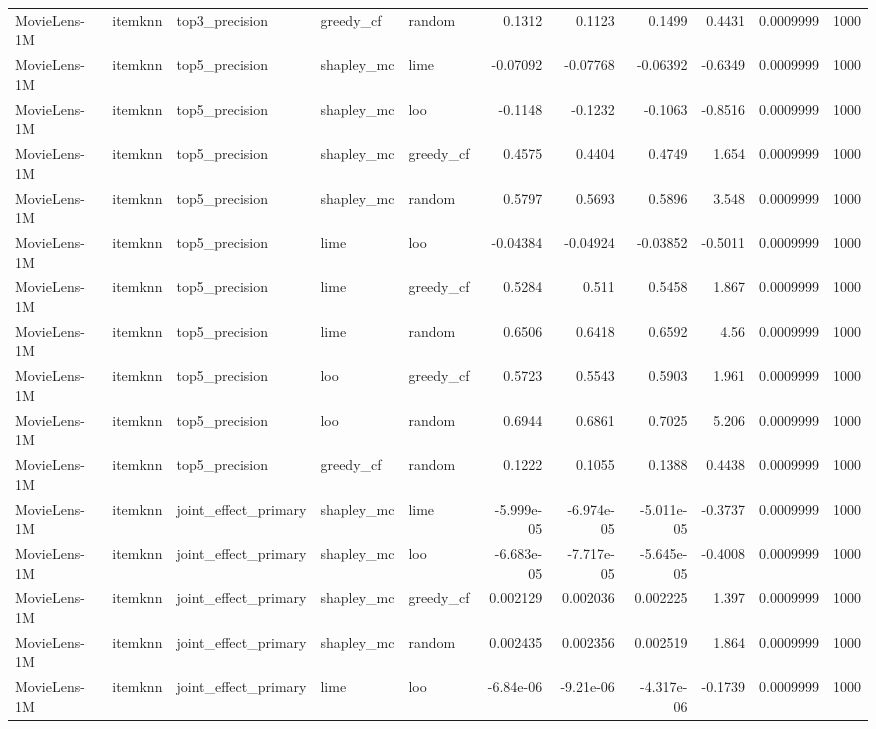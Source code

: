 \begin{table}[t]
\begin{tabular}{lllllrrrrrr}
MovieLens-1M & itemknn & top3\_precision & greedy\_cf & random & 0.1312 & 0.1123 & 0.1499 & 0.4431 & 0.0009999 & 1000 \\
MovieLens-1M & itemknn & top5\_precision & shapley\_mc & lime & -0.07092 & -0.07768 & -0.06392 & -0.6349 & 0.0009999 & 1000 \\
MovieLens-1M & itemknn & top5\_precision & shapley\_mc & loo & -0.1148 & -0.1232 & -0.1063 & -0.8516 & 0.0009999 & 1000 \\
MovieLens-1M & itemknn & top5\_precision & shapley\_mc & greedy\_cf & 0.4575 & 0.4404 & 0.4749 & 1.654 & 0.0009999 & 1000 \\
MovieLens-1M & itemknn & top5\_precision & shapley\_mc & random & 0.5797 & 0.5693 & 0.5896 & 3.548 & 0.0009999 & 1000 \\
MovieLens-1M & itemknn & top5\_precision & lime & loo & -0.04384 & -0.04924 & -0.03852 & -0.5011 & 0.0009999 & 1000 \\
MovieLens-1M & itemknn & top5\_precision & lime & greedy\_cf & 0.5284 & 0.511 & 0.5458 & 1.867 & 0.0009999 & 1000 \\
MovieLens-1M & itemknn & top5\_precision & lime & random & 0.6506 & 0.6418 & 0.6592 & 4.56 & 0.0009999 & 1000 \\
MovieLens-1M & itemknn & top5\_precision & loo & greedy\_cf & 0.5723 & 0.5543 & 0.5903 & 1.961 & 0.0009999 & 1000 \\
MovieLens-1M & itemknn & top5\_precision & loo & random & 0.6944 & 0.6861 & 0.7025 & 5.206 & 0.0009999 & 1000 \\
MovieLens-1M & itemknn & top5\_precision & greedy\_cf & random & 0.1222 & 0.1055 & 0.1388 & 0.4438 & 0.0009999 & 1000 \\
MovieLens-1M & itemknn & joint\_effect\_primary & shapley\_mc & lime & -5.999e-05 & -6.974e-05 & -5.011e-05 & -0.3737 & 0.0009999 & 1000 \\
MovieLens-1M & itemknn & joint\_effect\_primary & shapley\_mc & loo & -6.683e-05 & -7.717e-05 & -5.645e-05 & -0.4008 & 0.0009999 & 1000 \\
MovieLens-1M & itemknn & joint\_effect\_primary & shapley\_mc & greedy\_cf & 0.002129 & 0.002036 & 0.002225 & 1.397 & 0.0009999 & 1000 \\
MovieLens-1M & itemknn & joint\_effect\_primary & shapley\_mc & random & 0.002435 & 0.002356 & 0.002519 & 1.864 & 0.0009999 & 1000 \\
MovieLens-1M & itemknn & joint\_effect\_primary & lime & loo & -6.84e-06 & -9.21e-06 & -4.317e-06 & -0.1739 & 0.0009999 & 1000 \\

\end{tabular}
\end{table}
